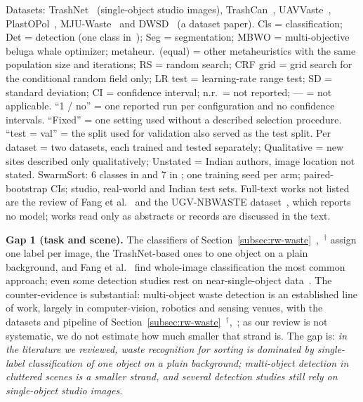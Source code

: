 \begin{table}[!t]
\vspace{3pt}
\begin{minipage}{\textwidth}
\scriptsize
Datasets: TrashNet~\cite{yang2016classification} (single-object studio images), TrashCan~\cite{hong2020trashcan}, UAVVaste~\cite{kraft2021autonomous}, PlastOPol~\cite{cordova2022litter}, MJU-Waste~\cite{wang2020multilevel} and DWSD~\cite{ali2025dwsd} (a dataset paper). Cls = classification; Det = detection (one class in~\cite{majchrowska2022deep,cordova2022litter}); Seg = segmentation; MBWO = multi-objective beluga whale optimizer; metaheur.\ (equal) = other metaheuristics with the same population size and iterations; RS = random search; CRF grid = grid search for the conditional random field only; LR test = learning-rate range test; SD = standard deviation; CI = confidence interval; n.r.\ = not reported; --- = not applicable. ``1 / no'' = one reported run per configuration and no confidence intervals. ``Fixed'' = one setting used without a described selection procedure. ``test = val'' = the split used for validation also served as the test split. Per dataset = two datasets, each trained and tested separately; Qualitative = new sites described only qualitatively; Unstated = Indian authors, image location not stated. SwarmSort: 6 classes in \genone and 7 in \gentwo; one training seed per arm; paired-bootstrap CIs; studio, real-world and Indian test sets. Full-text works not listed are the review of Fang et al.~\cite{fang2023artificial} and the UGV-NBWASTE dataset~\cite{isalm2025ugvnbwaste}, which reports no model; works read only as abstracts or records are discussed in the text.
\end{minipage}
\end{table}

\textbf{Gap 1 (task and scene).} The classifiers of Section~\ref{subsec:rw-waste}~\cite{yang2016classification,kaya2023classification,sayed2024intelligent},~\cite{alshammari2025smart,kumsetty2022trashbox}$^{\dagger}$ assign one label per image, the TrashNet-based ones to one object on a plain background, and Fang et al.~\cite{fang2023artificial} find whole-image classification the most common approach; even some detection studies rest on near-single-object data~\cite{melinte2020deep,kumar2021novel,isalm2025ugvnbwaste}. The counter-evidence is substantial: multi-object waste detection is an established line of work, largely in computer-vision, robotics and sensing venues, with the datasets and pipeline of Section~\ref{subsec:rw-waste}~\cite{proenca2020taco,bashkirova2022zerowaste,cheng2021flow,yudin2024hierarchical}$^{\dagger}$,~\cite{kraft2021autonomous,cordova2022litter,hong2020trashcan,majchrowska2022deep}; as our review is not systematic, we do not estimate how much smaller that strand is. The gap is: \emph{in the literature we reviewed, waste recognition for sorting is dominated by single-label classification of one object on a plain background; multi-object detection in cluttered scenes is a smaller strand, and several detection studies still rely on single-object studio images.}

